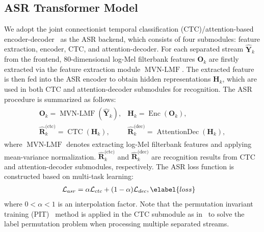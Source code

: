 \documentclass[a4paper]{article}
\begin{document}
\subsection{ASR Transformer Model}


We adopt the joint connectionist temporal classification (CTC)/attention-based encoder-decoder~\cite{Joint-Kim2017} as the ASR backend, which consists of four submodules: feature extraction, encoder, CTC, and attention-decoder.
For each separated stream $\hat{\mathbf{Y}}_k$ from the frontend, 80-dimensional log-Mel filterbank features $\mathbf{O}_k$ are firstly extracted via the feature extraction module $\operatorname{MVN-LMF}$.
The extracted feature is then fed into the ASR encoder to obtain hidden representations $\mathbf{H}_k$, which are used in both CTC and attention-decoder submodules for recognition.
The ASR procedure is summarized as follows:
\begin{align}
  \begin{array}{ll}
    \mathbf{O}_k = \operatorname{MVN-LMF}(\hat{\mathbf{Y}}_k), & 
    \mathbf{H}_k = \operatorname{Enc}(\mathbf{O}_k), \\
    \hat{\mathbf{R}}^{\text{(ctc)}}_k = \operatorname{CTC}(\mathbf{H}_k), &
    \hat{\mathbf{R}}^{\text{(dec)}}_k = \operatorname{AttentionDec}(\mathbf{H}_k),
  \end{array}
  \nonumber
\end{align}
where $\operatorname{MVN-LMF}$ denotes extracting log-Mel filterbank features and applying mean-variance normalization. $\hat{\mathbf{R}}^{\text{(ctc)}}_k$ and $\hat{\mathbf{R}}^{\text{(dec)}}_k$ are recognition results from CTC and attention-decoder submodules, respectively.
The ASR loss function is constructed based on multi-task learning:
\begin{align}
    \mathcal{L}_{asr} &= \alpha \mathcal{L}_{ctc} + (1 - \alpha) \mathcal{L}_{dec}, \elabel{loss}
\end{align}
where $0 < \alpha < 1$ is an interpolation factor.
Note that the permutation invariant training (PIT)~\cite{kolbaekMultitalkerSpeechSeparation2017} method is applied in the CTC submodule as in~\cite{changMIMOSpeechEndtoendMultichannel2019,changEndToEndMultiSpeaker2020} to solve the label permutation problem when processing multiple separated streams.
\end{document}
